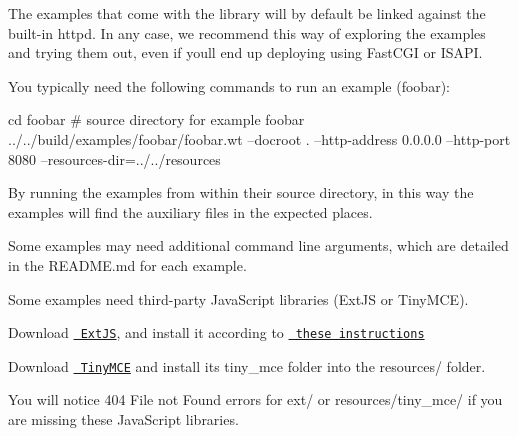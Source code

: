 The examples that come with the library will by default be linked against the built-\/in httpd. In any case, we recommend this way of exploring the examples and trying them out, even if you\textquotesingle{}ll end up deploying using Fast\+C\+GI or I\+S\+A\+PI.

You typically need the following commands to run an example ({\ttfamily foobar})\+: \begin{DoxyVerb}cd foobar # source directory for example foobar
../../build/examples/foobar/foobar.wt --docroot . --http-address 0.0.0.0 --http-port 8080 --resources-dir=../../resources
\end{DoxyVerb}


By running the examples from within their source directory, in this way the examples will find the auxiliary files in the expected places.

Some examples may need additional command line arguments, which are detailed in the R\+E\+A\+D\+M\+E.\+md for each example.

Some examples need third-\/party Java\+Script libraries (Ext\+JS or Tiny\+M\+CE).


\begin{DoxyItemize}
\item Download \href{http://yogurtearl.com/ext-2.0.2.zip}{\texttt{ Ext\+JS}}, and install it according to \href{http://www.webtoolkit.eu/wt/doc/reference/html/group__ext.html}{\texttt{ these instructions}}
\item Download \href{http://tinymce.moxiecode.com/}{\texttt{ Tiny\+M\+CE}} and install its tiny\+\_\+mce folder into the resources/ folder.
\end{DoxyItemize}

You will notice 404 File not Found errors for {\ttfamily ext/} or {\ttfamily resources/tiny\+\_\+mce/} if you are missing these Java\+Script libraries. 